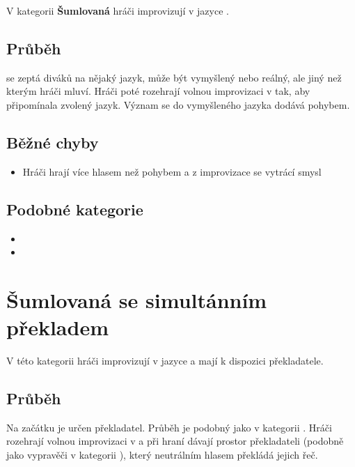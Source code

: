V kategorii \textbf{Šumlovaná}{} hráči improvizují v jazyce . 
 
\subsection{ Průběh }  se zeptá diváků na nějaký jazyk, může být vymyšlený nebo reálný, ale jiný než kterým hráči mluví. Hráči poté rozehrají volnou improvizaci v  tak, aby připomínala zvolený jazyk. Význam se do vymyšleného jazyka dodává pohybem. 
 
\subsection{ Běžné chyby } \begin{itemize}
\item  Hráči hrají více hlasem než pohybem a z improvizace se vytrácí smysl
\end{itemize}
 
\subsection{ Podobné kategorie } \begin{itemize}
\item  {}
\item  {}
\end{itemize}
 
 
 
 
\needspace{5cm} \section{Šumlovaná se simultánním překladem} \label{šumlovaná se simultánním překladem}  
 
V této kategorii hráči improvizují v jazyce  a mají k dispozici překladatele. 
 
\subsection{ Průběh } Na začátku je určen překladatel. Průběh je podobný jako v kategorii . Hráči rozehrají volnou improvizaci v  a při hraní dávají prostor překladateli (podobně jako vypravěči v kategorii ), který neutrálním hlasem překládá jejich řeč.  
 
